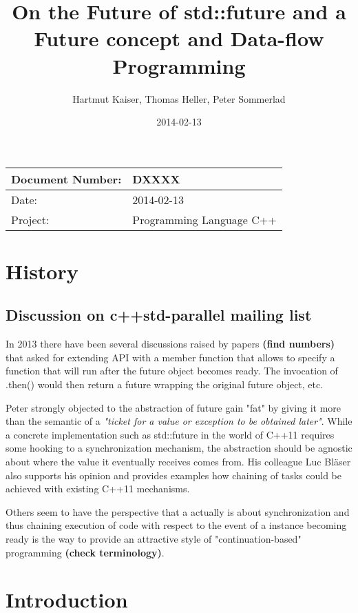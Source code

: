 \documentclass[ebook,11pt,article]{memoir}
\title{On the Future of std::future and a Future concept and Data-flow Programming}
\author{Hartmut Kaiser, Thomas Heller, Peter Sommerlad}
\date{2014-02-13}                                           %
\begin{document}
\maketitle
\begin{tabular}[t]{|l|l|}\hline 
Document Number: & DXXXX \\\hline
Date: & 2014-02-13 \\\hline
Project: & Programming Language C++\\\hline 
\end{tabular}
\chapter{History}
\section{Discussion on c++std-parallel mailing list}

In 2013 there have been several discussions raised by papers \textbf{(find numbers)} that asked for extending  API with a member function  that allows to specify a function that will run after the future object becomes ready. The invocation of .then() would then return a future wrapping the original future object, etc. 

Peter strongly objected to the abstraction of future gain "fat" by giving it more than the semantic of a \emph{"ticket for a value or exception to be obtained later"}. While a concrete implementation such as std::future in the world of C++11 requires some hooking to a synchronization mechanism, the abstraction should be agnostic about where the value it eventually receives comes from. His colleague Luc Bläser also supports his opinion and provides examples how chaining of tasks could be achieved with existing C++11 mechanisms.

Others seem to have the perspective that a  actually is about synchronization and thus chaining execution of code with respect to the event of a  instance becoming ready is the way to provide an attractive style of "continuation-based" programming \textbf{(check terminology)}.





\chapter{Introduction}
\section{}
\end{document}
